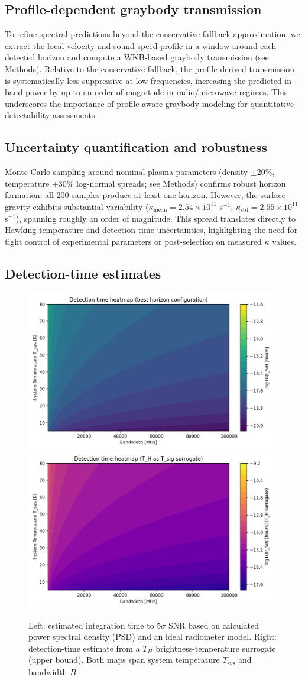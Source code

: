 \documentclass[11pt]{article}
\begin{document}
\subsection{Profile-dependent graybody transmission}
To refine spectral predictions beyond the conservative fallback approximation, we extract the local velocity and sound-speed profile in a window around each detected horizon and compute a WKB-based graybody transmission (see Methods). Relative to the conservative fallback, the profile-derived transmission is systematically less suppressive at low frequencies, increasing the predicted in-band power by up to an order of magnitude in radio/microwave regimes. This underscores the importance of profile-aware graybody modeling for quantitative detectability assessments.

\subsection{Uncertainty quantification and robustness}
Monte Carlo sampling around nominal plasma parameters (density $\pm$20\%, temperature $\pm$30\% log-normal spreads; see Methods) confirms robust horizon formation: all 200 samples produce at least one horizon. However, the surface gravity exhibits substantial variability ($\kappa_{\text{mean}} = 2.54 \times 10^{11}$ s$^{-1}$, $\kappa_{\text{std}} = 2.55 \times 10^{11}$ s$^{-1}$), spanning roughly an order of magnitude. This spread translates directly to Hawking temperature and detection-time uncertainties, highlighting the need for tight control of experimental parameters or post-selection on measured $\kappa$ values.

\subsection{Detection-time estimates}
\begin{figure}[h]
  \centering
  \includegraphics[width=0.48\linewidth]{figures/horizon_analysis_detection_time.png}\hfill
  \includegraphics[width=0.48\linewidth]{figures/horizon_analysis_detection_time_TH.png}
  \caption{Left: estimated integration time to $5\sigma$ SNR based on calculated power spectral density (PSD) and an ideal radiometer model. Right: detection-time estimate from a $T_H$ brightness-temperature surrogate (upper bound). Both maps span system temperature $T_{\text{sys}}$ and bandwidth $B$.}
\end{figure}
\end{document}
